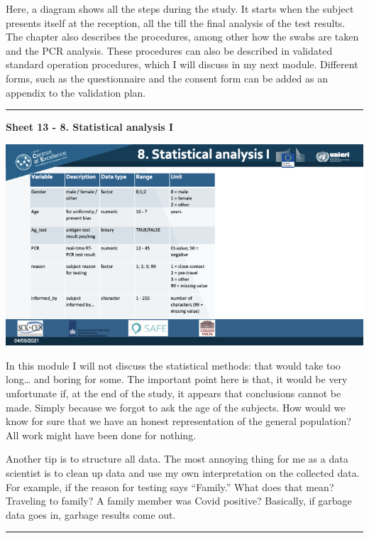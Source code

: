 \documentclass[
]{book}
\begin{document}
Here, a diagram shows all the steps during the study. It starts when the
subject presents itself at the reception, all the till the final
analysis of the test results. The chapter also describes the procedures,
among other how the swabs are taken and the PCR analysis. These
procedures can also be described in validated standard operation
procedures, which I will discuss in my next module. Different forms,
such as the questionnaire and the consent form can be added as an
appendix to the validation plan.

\begin{center}\rule{0.5\linewidth}{0.5pt}\end{center}

\textbf{Sheet 13 - 8. Statistical analysis I}

\includegraphics{images/m03/m03_validation_of_test_kits_v2_2.013.jpeg}

In this module I will not discuss the statistical methods: that would
take too long\ldots{} and boring for some. The important point here is that,
it would be very unfortunate if, at the end of the study, it appears
that conclusions cannot be made. Simply because we forgot to ask the age
of the subjects. How would we know for sure that we have an honest
representation of the general population? All work might have been done
for nothing.

Another tip is to structure all data. The most annoying thing for me as
a data scientist is to clean up data and use my own interpretation on
the collected data. For example, if the reason for testing says
``Family.'' What does that mean? Traveling to family? A
family member was Covid positive? Basically, if garbage data goes in,
garbage results come out.

\begin{center}\rule{0.5\linewidth}{0.5pt}\end{center}
\end{document}
